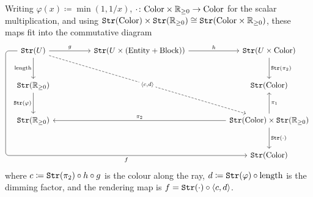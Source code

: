 Writing $\varphi(x) \coloneqq \min(1, 1/x)$, $\cdot \colon \mathrm{Color} \times
\mathbb{R}_{\ge 0} \to \mathrm{Color}$ for the scalar multiplication, and using
$\texttt{Str}(\mathrm{Color}) \times \texttt{Str}(\mathbb{R}_{\ge 0}) \cong
\texttt{Str}(\mathrm{Color} \times \mathbb{R}_{\ge 0})$, these maps fit into the
commutative diagram
\[
	\begin{tikzcd}[column sep=huge, row sep=large]
		\Stream(U) \ar[r, "g"] \ar[d, "\mathrm{length}"']
		\ar[ddrr, dashed, "{\langle c, d \rangle}" description]
		\ar[dddrr, rounded corners, "f"' pos=0.75,
		to path={(\tikztostart.west) -- ++(-1.5em,0) |- (\tikztotarget.west) \tikztonodes}]
		& \Stream(U \times (\Entity + \Block)) \ar[r, "h"]
		& \Stream(U \times \mathrm{Color}) \ar[d, "\Stream(\pi_2)"] \\
		\Stream(\RR_{\ge 0}) \ar[d, "\Stream(\varphi)"']
		& & \Stream(\mathrm{Color}) \\
		\Stream(\RR_{\ge 0})
		& & \Stream(\mathrm{Color}) \times \Stream(\RR_{\ge 0})
		\ar[u, "\pi_1"'] \ar[ll, "\pi_2"'] \ar[d, "\Stream(\cdot)"] \\
		& & \Stream(\mathrm{Color})
	\end{tikzcd}
\]
where $c \coloneqq \texttt{Str}(\pi_2) \circ h \circ g$ is the colour along the ray,
$d \coloneqq \texttt{Str}(\varphi) \circ \mathrm{length}$ is the dimming factor, and
the rendering map is $f = \texttt{Str}(\cdot) \circ \langle c, d \rangle$.

